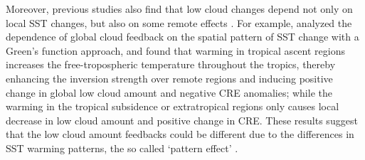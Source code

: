 
 Moreover, previous studies also find that low cloud changes depend not only on local SST changes, but also on some remote effects \citep[e.g.,][]{Zhou2015,Zhou2016,Zhou2017,Mauritsen2016clouds,Andrews2018}. For example, \cite{Zhou2017} analyzed the dependence of global cloud feedback on the spatial pattern of SST change with a Green's function approach, and found that warming in tropical ascent regions increases the free-tropospheric temperature throughout the tropics, thereby enhancing the inversion strength over remote regions and inducing positive change in global low cloud amount and negative CRE anomalies; while the warming in the tropical subsidence or extratropical regions only causes local decrease in low cloud amount and positive change in CRE. These results suggest that the low cloud amount feedbacks could be different due to the differences in SST warming patterns, the so called `pattern effect' \citep[e.g.,][]{Dong2020intermodel}.

